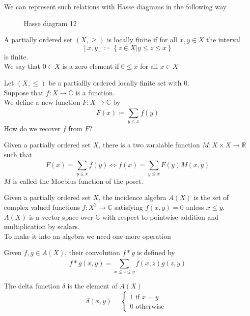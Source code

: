 \documentclass[../main.tex]{subfiles}
\begin{document}
We can represent such relations with Hasse diagrams in the following way
\begin{figure}[H]
    \centering
    \caption{Hasse diagram 12}
    \label{fig:hasse-diagram-12}
\end{figure}
\begin{defn}
	A partially ordered set $( X, \geq ) $ is locally  finite if for all $x,y\in X$ the interval
	\[ 
	[ x,y] \coloneqq \left\{ z \in X| y \leq z \leq x \right\} 
	\]
	is finite.\\
We say that $0\in X$ is a zero element if $0\leq x$ for all $x \in X$
\end{defn}
Let $ ( X, \leq ) $ be a partiallly ordered locally finite set with $0$.\\
Suppose that $f: X \to \mathbb{C}$ is a function.\\
We define a new function $F: X \to \mathbb{C}$ by
\[ 
	F( x) \coloneqq  \sum_{y \leq x}^{ } f( y) 
\]
How do we recover $f$ from $F$?
\begin{thm}
	Given a partially ordered set $X$, there is a two varaiable function $M:X \times X\to \mathbb{R}$ such that 
	\[ 
		F( x) = \sum_{y \leq  x}^{ } f( y)  \iff f( x) = \sum_{y \leq x}^{ } F( y)  M( x,y) 
	\]
	$M$ is called the Moebius function of the poset.
\end{thm}
\begin{defn}
	Given a partially ordered set $X$, the incidence algebra $A( X) $ is the set of complex valued functions $f: X^{2} \to \mathbb{C}$ satisfying $f( x,y) =0$ unless $x \leq y$.\\
	$A( X) $ is a vector space over $\mathbb{C}$ with respect to pointwise addition and multiplication by scalars.\\
To make it into an algebra we need one more operation
	
\end{defn}
\begin{defn}[Convolution]
	Given $f, g \in A( X) $, their convolution $f \ast g$ is defined by
	\[ 
		f \ast g ( x,y)  = \sum_{x \leq z \leq y}^{ } f( x,z) g( z,y) 
	\]
	
\end{defn}
\begin{defn}
	The delta function $\delta $ is the element of $A( X) $ 
	\[ 
		\delta ( x,y)  = 
		\begin{cases}
		1 \text{ if }  x=y\\
		0 \text{ otherwise } 
		\end{cases}
	\]
	

\end{defn}
\end{document}
